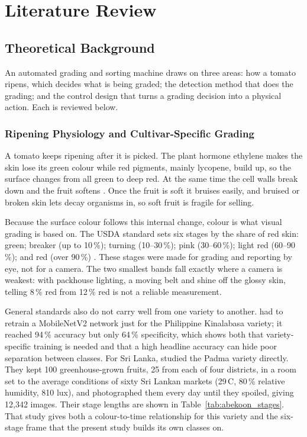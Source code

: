 \section{Literature Review}
\label{ch:literature}

\subsection{Theoretical Background}
\label{sec:theory}

An automated grading and sorting machine draws on three areas: how a tomato ripens, which decides what is being graded; the detection method that does the grading; and the control design that turns a grading decision into a physical action. Each is reviewed below.

\subsubsection{Ripening Physiology and Cultivar-Specific Grading}
\label{sec:ripening}

A tomato keeps ripening after it is picked. The plant hormone ethylene makes the skin lose its green colour while red pigments, mainly lycopene, build up, so the surface changes from all green to deep red. At the same time the cell walls break down and the fruit softens \citep{abekoon2024}. Once the fruit is soft it bruises easily, and bruised or broken skin lets decay organisms in, so soft fruit is fragile for selling.

Because the surface colour follows this internal change, colour is what visual grading is based on. The \acrfull{USDA} standard sets six stages by the share of red skin: green; breaker (up to 10\,\%); turning (10--30\,\%); pink (30--60\,\%); light red (60--90\,\%); and red (over 90\,\%) \citep{usda1991}. These stages were made for grading and reporting by eye, not for a camera. The two smallest bands fall exactly where a camera is weakest: with packhouse lighting, a moving belt and shine off the glossy skin, telling 8\,\% red from 12\,\% red is not a reliable measurement.

General standards also do not carry well from one variety to another. \citet{nalupano2024} had to retrain a MobileNetV2 network just for the Philippine Kinalabasa variety; it reached 94\,\% accuracy but only 64\,\% specificity, which shows both that variety-specific training is needed and that a high headline accuracy can hide poor separation between classes. For Sri Lanka, \citet{abekoon2024} studied the Padma variety directly. They kept 100 greenhouse-grown fruits, 25 from each of four districts, in a room set to the average conditions of sixty Sri Lankan markets (29\,\textdegree C, 80\,\% relative humidity, 810 lux), and photographed them every day until they spoiled, giving 12,342 images. Their stage lengths are shown in Table~\ref{tab:abekoon_stages}. That study gives both a colour-to-time relationship for this variety and the six-stage frame that the present study builds its own classes on.

